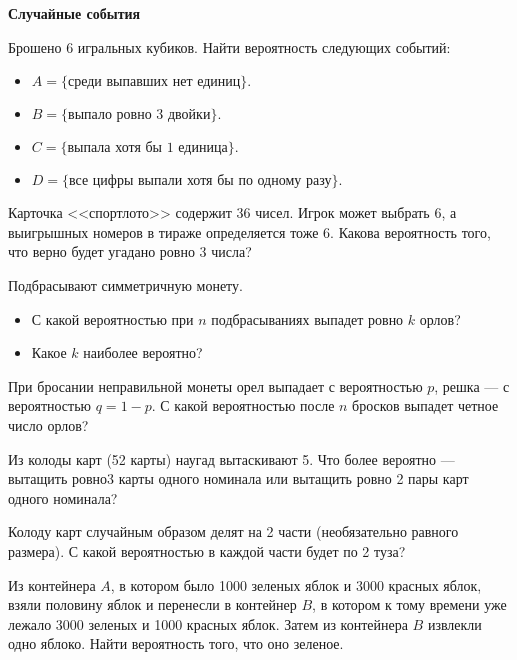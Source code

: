\documentclass{article}
\begin{document}
    \large

    \begin{center}
        \textbf{Случайные события}
    \end{center}


    \begin{enumerate_boxed}

        \item Брошено 6 игральных кубиков.
        Найти вероятность следующих событий:
        \begin{itemize}
            \item $A= \{\text{среди выпавших нет единиц}\}.$
            \item $B= \{\text{выпало ровно 3 двойки}\}.$
            \item $C= \{\text{выпала хотя бы 1 единица}\}.$
            \item $D= \{\text{все цифры выпали хотя бы по одному разу}\}.$
        \end{itemize}

        \item Карточка <<спортлото>> содержит 36 чисел.
        Игрок может выбрать 6, а выигрышных номеров в тираже определяется тоже 6.
        Какова вероятность того, что верно будет угадано ровно 3 числа?

        \item Подбрасывают симметричную монету.
        \begin{itemize}
            \item С какой вероятностью при $n$ подбрасываниях выпадет ровно $k$ орлов?
            \item Какое $k$ наиболее вероятно?
        \end{itemize}

        \item  При бросании неправильной монеты орел выпадает с вероятностью $p$, решка — с вероятностью $q=  1-p$.
        С какой вероятностью после $n$ бросков выпадет четное число орлов?

        \item Из колоды карт (52 карты) наугад вытаскивают 5.
        Что более вероятно — вытащить ровно3 карты одного номинала или вытащить ровно 2 пары карт одного номинала?

        \item Колоду карт случайным образом делят на 2 части (необязательно равного размера).
        С какой вероятностью в каждой части будет по 2 туза?

        \item Из контейнера $A$, в котором было 1000 зеленых яблок и 3000 красных яблок, взяли половину яблок и перенесли в контейнер $B$, в котором к тому времени уже лежало 3000 зеленых и 1000 красных яблок.
        Затем из контейнера $B$ извлекли одно яблоко.
        Найти вероятность того, что оно зеленое.


\end{enumerate_boxed}
\end{document}
